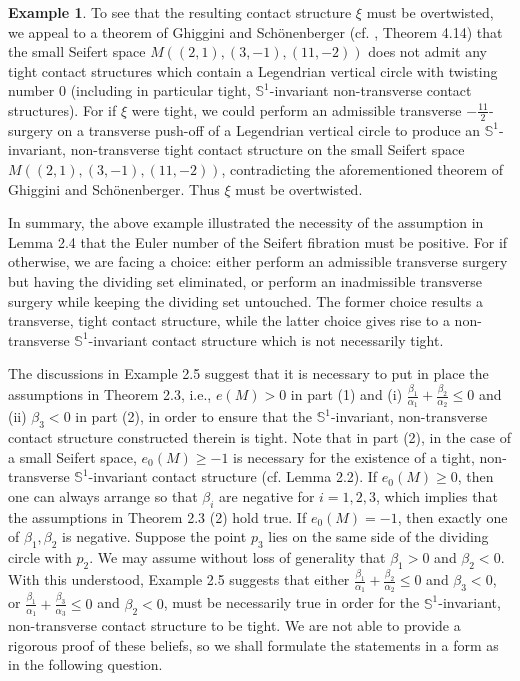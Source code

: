 \documentclass[11pt]{amsart}
\theoremstyle{plain}
\numberwithin{theorem}{section}
\theoremstyle{definition}
\newtheorem{example}[theorem]{Example}
\newcommand{\s}{{\mathbb S}}
\begin{document}
\begin{example}
To see that the resulting contact structure $\xi$ must be overtwisted, we appeal to a theorem of 
Ghiggini and Sch\"{o}nenberger (cf. \cite{GSch}, Theorem 4.14) that the small Seifert space 
$M((2,1),(3,-1),(11,-2))$ does not admit any tight contact structures which contain a Legendrian vertical circle with twisting number $0$ (including in particular tight, $\s^1$-invariant non-transverse contact structures).
For if $\xi$ were tight, we could perform an admissible transverse $-\frac{11}{2}$-surgery on a transverse push-off of a Legendrian vertical circle to produce an $\s^1$-invariant, non-transverse tight contact structure on the small Seifert space $M((2,1),(3,-1), (11,-2))$, contradicting the aforementioned theorem of Ghiggini and Sch\"{o}nenberger. Thus $\xi$ must be overtwisted. 

In summary, the above example illustrated the necessity of the assumption in Lemma 2.4 that the
Euler number of the Seifert fibration must be positive. For if otherwise, we are facing a choice:
either perform an admissible transverse surgery but having the dividing set eliminated, or perform 
an inadmissible transverse surgery while keeping the dividing set untouched. The former choice 
results a transverse, tight contact structure, while the latter choice gives rise to a non-transverse 
$\s^1$-invariant contact structure which is not necessarily tight. 
\end{example}

The discussions in Example 2.5 suggest that it is necessary to put in place the assumptions in 
Theorem 2.3, i.e., $e(M)>0$ in part (1) and (i) $\frac{\beta_1}{\alpha_1}+\frac{\beta_2}{\alpha_2}\leq 0$ 
and (ii) $\beta_3<0$ in part (2), in order to ensure that the $\s^1$-invariant, non-transverse 
contact structure constructed therein is tight. Note that in part (2), in the case of a small Seifert space, 
$e_0(M)\geq -1$ is necessary for the existence of a tight, non-transverse $\s^1$-invariant contact structure
(cf. Lemma 2.2). If $e_0(M)\geq 0$, then one can always arrange so that $\beta_i$ are negative for $i=1,2,3$,
which implies that the assumptions in Theorem 2.3 (2) hold true. If $e_0(M)=-1$, then exactly one of 
$\beta_1,\beta_2$ is negative. Suppose the point $p_3$ lies on the same side of the dividing circle with $p_2$. 
We may assume without loss of generality that $\beta_1>0$ and $\beta_2<0$. With this understood, 
Example 2.5 suggests that either $\frac{\beta_1}{\alpha_1}+\frac{\beta_2}{\alpha_2}\leq 0$ and $\beta_3<0$, or $\frac{\beta_1}{\alpha_1}+\frac{\beta_3}{\alpha_3}\leq 0$ and $\beta_2<0$, must be necessarily true in order for the $\s^1$-invariant, non-transverse contact structure to be tight. We are not able to provide a rigorous proof of these beliefs, so we shall formulate the statements in a form as in the following question. 
\end{document}
